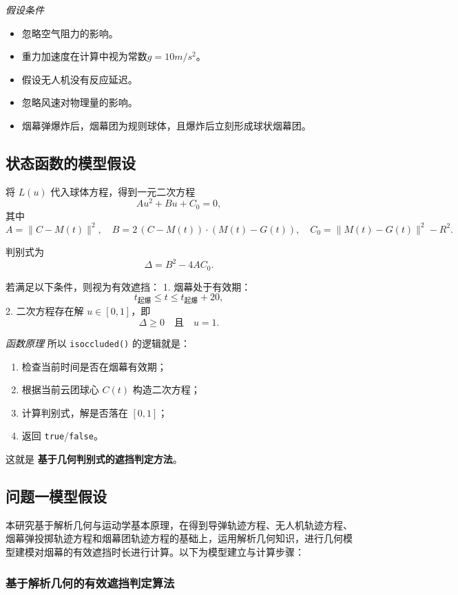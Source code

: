 \documentclass{article}
\begin{document}
\textit{假设条件}
\begin{itemize}
    \item 忽略空气阻力的影响。
    \item 重力加速度在计算中视为常数$g = 10m/s^2$。
    \item 假设无人机没有反应延迟。
    \item 忽略风速对物理量的影响。
    \item 烟幕弹爆炸后，烟幕团为规则球体，且爆炸后立刻形成球状烟幕团。
\end{itemize}
\subsection{状态函数的模型假设}
将 $L(u)$ 代入球体方程，得到一元二次方程
\[
A u^2 + B u + C_0 = 0,
\]
其中
\[
A = \|C - M(t)\|^2, \quad
B = 2\,(C - M(t)) \cdot (M(t) - G(t)), \quad
C_0 = \|M(t) - G(t)\|^2 - R^2.
\]

判别式为
\[
\Delta = B^2 - 4AC_0.
\]

若满足以下条件，则视为有效遮挡：
1. 烟幕处于有效期：
\[
t_{\text{起爆}} \leq t \leq t_{\text{起爆}} + 20,
\]
2. 二次方程存在解 $u \in [0,1]$，即
\[
\Delta \geq 0 \quad \text{且} \quad u = 1.
\]

\textit{函数原理}
所以 \texttt{isoccluded()} 的逻辑就是：

\begin{enumerate}[leftmargin=*,label=\arabic*.]
  \item 检查当前时间是否在烟幕有效期；
  \item 根据当前云团球心 \(C(t)\) 构造二次方程；
  \item 计算判别式，解是否落在 \([0,1]\)；
  \item 返回 \texttt{true}/\texttt{false}。
\end{enumerate}

这就是 \textbf{基于几何判别式的遮挡判定方法}。

\subsection{问题一模型假设}

本研究基于解析几何与运动学基本原理，在得到导弹轨迹方程、无人机轨迹方程、烟幕弹投掷轨迹方程和烟幕团轨迹方程的基础上，运用解析几何知识，进行几何模型建模对烟幕的有效遮挡时长进行计算。以下为模型建立与计算步骤：

\subsubsection{基于解析几何的有效遮挡判定算法}
\end{document}
